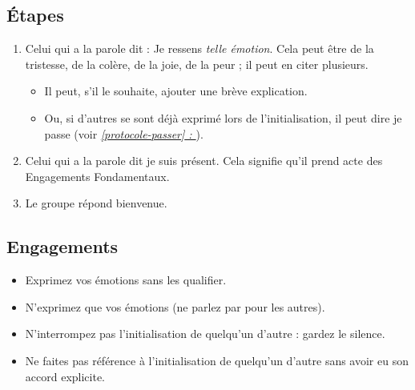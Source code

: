 \documentclass[11pt]{book}
\newcommand*{\fullref}[1]{\textit{\hyperref[{#1}]{\autoref*{#1} : \nameref*{#1}}}}
\begin{document}
\subsection{Étapes}
\begin{enumerate}
	\item Celui qui a la parole dit : \og{}Je ressens \emph{telle émotion}\fg{}. Cela peut être de la tristesse, de la colère, de la joie, de la peur ;
	      il peut en citer plusieurs.
	      \begin{itemize}
	      	\item Il peut, s'il le souhaite, ajouter une brève explication.
	      	\item Ou, si d'autres se sont déjà exprimé lors de l'initialisation, il peut dire \og{}je passe\fg{} (voir \fullref{protocole-passer}).
	      \end{itemize}
	\item Celui qui a la parole dit \og{}je suis présent\fg{}. Cela signifie qu'il prend acte des Engagements Fondamentaux.
	\item Le groupe répond \og{}bienvenue\fg{}.
\end{enumerate}

\subsection{Engagements}
\begin{itemize}
	\item Exprimez vos émotions sans les qualifier.
	\item N'exprimez que vos émotions (ne parlez par pour les autres).
	\item N'interrompez pas l'initialisation de quelqu'un d'autre : gardez le silence.
	\item Ne faites pas référence à l'initialisation de quelqu'un d'autre sans avoir eu son accord explicite.
\end{itemize}
\end{document}
